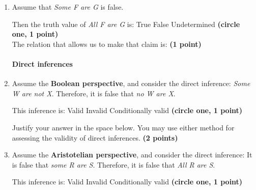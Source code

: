 \documentclass[10pt]{article}
\begin{document}
\begin{enumerate}
  \item Assume that \textit{Some F are G} is false. 
  
  Then the truth value of \textit{All F are G} is: \hspace{1cm} True \hspace{1cm} False \hspace{1cm} Undetermined \hspace{1cm} \textbf{(circle one, 1 point)} \\
  
  The relation that allows us to make that claim is: \underline{\hspace{3in}} \textbf{(1 point)}
  

\paragraph{Direct inferences}

  \item Assume the \textbf{Boolean perspective}, and consider the direct inference: \textit{Some W are not X}. Therefore, it is false that \textit{no W are X}.
  
  \vspace{3mm}
  
  This inference is: \hspace{1cm} Valid \hspace{1cm} Invalid \hspace{1cm} Conditionally valid \hspace{1cm} \textbf{(circle one, 1 point)}
  
  \vspace{3mm}
  
  Justify your answer in the space below.  You may use either method for assessing the validity of direct inferences. \textbf{(2 points)}
  
  \vspace{4cm}
  
  \item Assume the \textbf{Aristotelian perspective}, and consider the direct inference: It is false that \textit{some R are S}. Therefore, it is false that \textit{All R are S}.
  
  \vspace{3mm}
  
  This inference is: \hspace{1cm} Valid \hspace{1cm} Invalid \hspace{1cm} Conditionally valid \hspace{1cm} \textbf{(circle one, 1 point)}
  

\end{enumerate}
\end{document}
